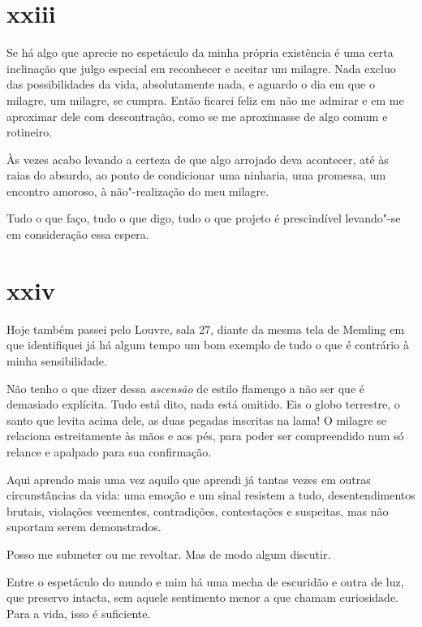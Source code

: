 \section{xxiii}

Se há algo que aprecie no espetáculo da minha própria existência é
uma certa inclinação que julgo especial em reconhecer e aceitar um
milagre. Nada excluo das possibilidades da vida, absolutamente nada, e
aguardo o dia em que o milagre, um milagre, se cumpra. Então ficarei
feliz em não me admirar e em me aproximar dele com descontração, como se
me aproximasse de algo comum e rotineiro.

Às vezes acabo levando a certeza de que algo arrojado deva
acontecer, até às raias do absurdo, ao ponto de condicionar uma
ninharia, uma promessa, um encontro amoroso, à não"-realização do meu
milagre.

Tudo o que faço, tudo o que digo, tudo o que projeto é
prescindível levando"-se em consideração essa espera.

\section{xxiv}

Hoje também passei pelo Louvre, sala 27, diante da mesma tela de
Memling em que identifiquei já há algum tempo um bom exemplo de tudo o
que é contrário à minha sensibilidade.

Não tenho o que dizer dessa \emph{ascensão} de estilo flamengo a não ser
que é demasiado explícita. Tudo está dito, nada está omitido. Eis o
globo terrestre, o santo que levita acima dele, as duas pegadas
inscritas na lama! O milagre se relaciona estreitamente às mãos e aos
pés, para poder ser compreendido num só relance e apalpado para sua
confirmação.

Aqui aprendo mais uma vez aquilo que aprendi já tantas vezes em outras
circunstâncias da vida: uma emoção e um sinal resistem a tudo,
desentendimentos brutais, violações veementes, contradições,
contestações e suspeitas, mas não suportam serem demonstrados.

Posso me submeter ou me revoltar. Mas de modo algum discutir.

Entre o espetáculo do mundo e mim há uma mecha de escuridão e outra de
luz, que preservo intacta, sem aquele sentimento menor a que chamam
curiosidade. Para a vida, isso é suficiente.
